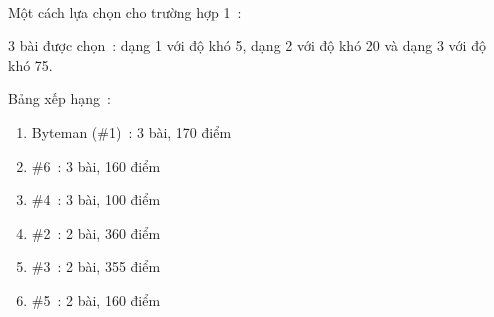 

Một cách lựa chọn cho trường hợp 1 :

3 bài được chọn : dạng 1 với độ khó 5, dạng 2 với độ khó 20 và dạng 3 với độ khó 75.

Bảng xếp hạng :
\begin{enumerate}
	\item 

Byteman (\#1) : 3 bài, 170 điểm
	\item 

\#6 : 3 bài, 160 điểm
	\item 

\#4 : 3 bài, 100 điểm
	\item 

\#2 : 2 bài, 360 điểm
	\item 

\#3 : 2 bài, 355 điểm
	\item 

\#5 : 2 bài, 160 điểm
\end{enumerate}
